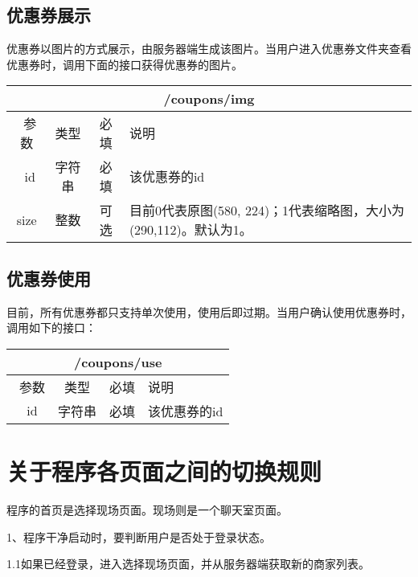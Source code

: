 \documentclass[cs4size]{ctexartutf8}
\begin{document}
\subsection{优惠券展示}
优惠券以图片的方式展示，由服务器端生成该图片。当用户进入优惠券文件夹查看优惠券时，调用下面的接口获得优惠券的图片。

\begin{table}[H]
   \begin{center}
\begin{tabular}{|c|c|c|p{12cm}|}
\hline
\multicolumn{4}{|c|}{/coupons/img} \\
\hline\hline
 \  参数  & 类型 & 必填 &  说明  \\
\hline
 \  id  & 字符串 & 必填 &  该优惠券的id  \\
\hline
 size  & 整数 & 可选 &  目前0代表原图(580, 224)；1代表缩略图，大小为(290,112)。默认为1。\\ 
\hline
\end{tabular}
   \end{center}
\end{table}



\subsection{优惠券使用}
目前，所有优惠券都只支持单次使用，使用后即过期。当用户确认使用优惠券时，调用如下的接口：
\begin{table}[H]
   \begin{center}
\begin{tabular}{|c|c|c|p{12cm}|}
\hline
\multicolumn{4}{|c|}{/coupons/use} \\
\hline\hline
 \  参数  & 类型 & 必填 &  说明  \\
\hline
 \  id  & 字符串 & 必填 &  该优惠券的id  \\
\hline
\end{tabular}
   \end{center}
\end{table}


\section{关于程序各页面之间的切换规则}

程序的首页是选择现场页面。现场则是一个聊天室页面。

1、程序干净启动时，要判断用户是否处于登录状态。

1.1如果已经登录，进入选择现场页面，并从服务器端获取新的商家列表。
\end{document}
